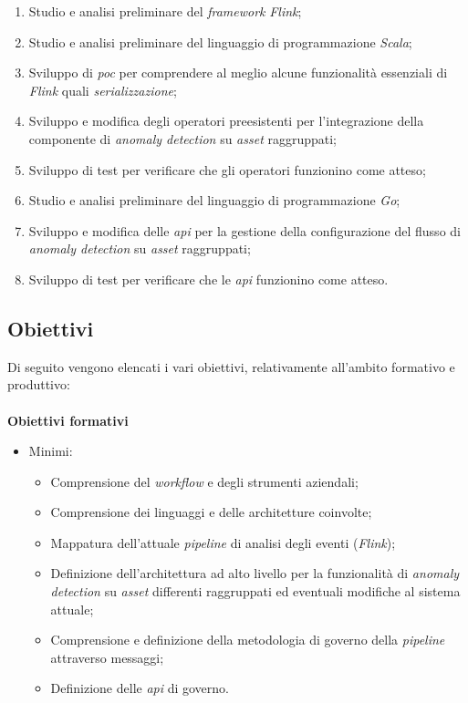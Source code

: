 \begin{enumerate}
	\item{Studio e analisi preliminare del \textit{\textit{\gls{framework}}} \textit{Flink};}
	\item{Studio e analisi preliminare del linguaggio di programmazione \textit{Scala};}
	\item{Sviluppo di \textit{\gls{poc}} per comprendere al meglio alcune funzionalità essenziali di \textit{Flink} quali \textit{\gls{serializzazione}};}
	\item{Sviluppo e modifica degli operatori preesistenti per l'integrazione della componente di \textit{anomaly detection} su \textit{asset} raggruppati;}
	\item{Sviluppo di test per verificare che gli operatori funzionino come atteso;}
	\item{Studio e analisi preliminare del linguaggio di programmazione \textit{Go};}
	\item{Sviluppo e modifica delle \textit{\gls{api}} per la gestione della configurazione del flusso di \textit{anomaly detection} su \textit{asset} raggruppati;}
	\item{Sviluppo di test per verificare che le \textit{\gls{api}} funzionino come atteso.}
\end{enumerate}

\subsection{Obiettivi}
Di seguito vengono elencati i vari obiettivi, relativamente all'ambito formativo e produttivo:
\\ \\
\textbf{Obiettivi formativi}
\begin{itemize}
	\item{Minimi:
		\begin{itemize}
			\item{Comprensione del \textit{workflow} e degli strumenti aziendali;}
			\item{Comprensione dei linguaggi e delle architetture coinvolte;}
			\item{Mappatura dell'attuale \textit{\gls{pipeline}} di analisi degli eventi (\textit{Flink});}
			\item{Definizione dell'architettura ad alto livello per la funzionalità di \textit{anomaly detection} su \textit{asset} differenti raggruppati ed eventuali modifiche al sistema attuale;}
			\item{Comprensione e definizione della metodologia di governo della \textit{\gls{pipeline}} attraverso messaggi;}
			\item{Definizione delle \textit{\gls{api}} di governo.}
		\end{itemize}			
	}
\end{itemize}

